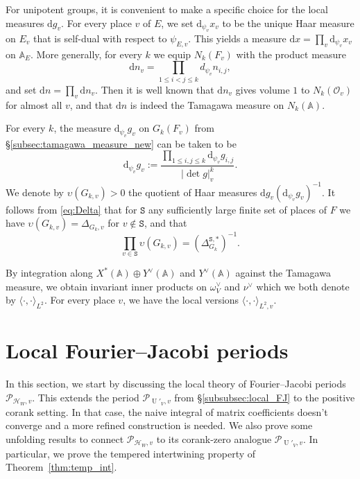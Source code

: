 \documentclass[letterpaper,11pt]{amsart}
\newcommand{\bA}{\mathbb{A}}
\newcommand{\cH}{\mathcal{H}}
\newcommand{\cO}{\mathcal{O}}
\newcommand{\cP}{\mathcal{P}}
\newcommand{\rd}{\mathrm{d}}
\newcommand{\tS}{\mathtt{S}}
\newcommand{\<}{\negthickspace}
\newcommand{\valP}[1]{\left|#1\right|}
\DeclareMathOperator{\U}{U}
\theoremstyle{definition}
\theoremstyle{plain}
\theoremstyle{remark}
\numberwithin{equation}{section}
\begin{document}
For unipotent groups, it is convenient to make a specific choice for the local measures $\rd g_v$. For every place $v$ of $E$, we set $\rd_{\psi_v} x_v$ to be the unique Haar measure on $E_v$ that is self-dual with respect to $\psi_{E,v}$. This yields a measure $\rd x = \prod_v \rd_{\psi_v} x_v$ on $\bA_E$. More generally, for every $k$ we equip $N_k(F_v)$ with the product measure
\begin{equation*}
    \rd n_v= \prod_{1 \leq i < j \leq k} d_{\psi_v} n_{i,j},
\end{equation*}
and set $\rd n = \prod_v \rd n_v$. Then it is well known that $\rd n_v$ gives volume $1$ to $N_k(\cO_v)$ for almost all $v$, and that $\rd n$ is indeed the Tamagawa measure on $N_k(\bA)$.

For every $k$, the measure $\rd_{\psi_v} g_v$ on $G_k(F_v)$ from \S\ref{subsec:tamagawa_measure_new} can be taken to be
\begin{equation*}
    \rd_{\psi_v} g_v := \frac{\prod_{1 \leq i,j \leq k} \rd_{\psi_v} g_{i,j}}{\valP{\det g}_v^k}.
\end{equation*}
We denote by $\upsilon(G_{k,v}) >0$ the quotient of Haar measures $\rd g_v (\rd_{\psi_v} g_v)^{-1}$. It follows from \eqref{eq:Delta} that for $\tS$ any sufficiently large finite set of places of $F$ we have $\upsilon(G_{k,v})=\Delta_{G_k,v}$ for $v \notin \tS$, and that
\begin{equation}
\label{eq:normalization_measures}
    \prod_{v \in \tS} \upsilon(G_{k,v})=(\Delta_{G_k}^{\tS,*})^{-1}.
\end{equation}

By integration along $X^*(\bA) \oplus Y^\vee(\bA)$ and $Y^\vee(\bA)$ against the Tamagawa measure, we obtain invariant inner products on $\omega_V^\vee$ and $\nu^\vee$ which we both denote by $\langle \cdot , \cdot\rangle_{L^2}$. For every place $v$, we have the local versions $\langle \cdot , \cdot \rangle_{L^2,v}$.

\section{Local Fourier--Jacobi periods}

\label{sec:local_FJ}
In this section, we start by discussing the local theory of Fourier--Jacobi periods $\cP_{\cH_W,v}$. This extends the period $\cP_{\U'_V,v}$ from \S\ref{subsubsec:local_FJ} to the positive corank setting. In that case, the naive integral of matrix coefficients doesn't converge and a more refined construction is needed. We also prove some unfolding results to connect $\cP_{\cH_W,v}$ to its corank-zero analogue $\cP_{\U'_V,v}$. In particular, we prove the tempered intertwining property of Theorem~\ref{thm:temp_int}. 
\end{document}
